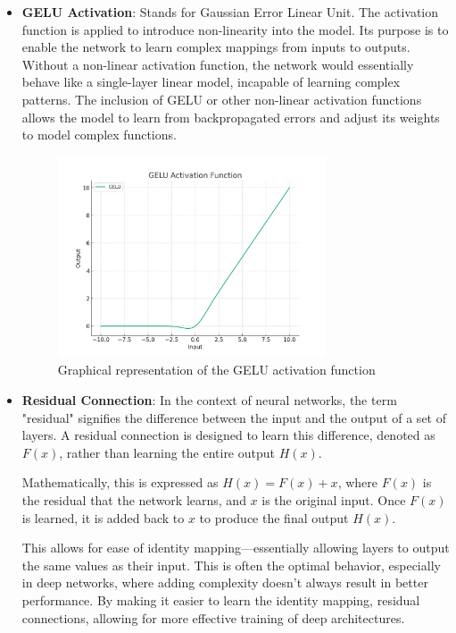 \documentclass[a4paper,12pt,openright]{book}
\begin{document}
\begin{itemize}
    
   \item \textbf{GELU Activation}: Stands for Gaussian Error Linear Unit. The activation function is applied to introduce non-linearity into the model. Its purpose is to enable the network to learn complex mappings from inputs to outputs. Without a non-linear activation function, the network would essentially behave like a single-layer linear model, incapable of learning complex patterns. The inclusion of GELU or other non-linear activation functions allows the model to learn from backpropagated errors and adjust its weights to model complex functions.
   
    \begin{figure}[ht]
        \centering
        \includegraphics[width=0.75\textwidth]{images/gelu.png}
        \caption{Graphical representation of the GELU activation function}
    \end{figure}

   \item \textbf{Residual Connection}:
In the context of neural networks, the term "residual" signifies the difference between the input and the output of a set of layers. A residual connection is designed to learn this difference, denoted as \( F(x) \), rather than learning the entire output \( H(x) \).

Mathematically, this is expressed as \( H(x) = F(x) + x \), where \( F(x) \) is the residual that the network learns, and \( x \) is the original input. Once \( F(x) \) is learned, it is added back to \( x \) to produce the final output \( H(x) \).

This allows for ease of identity mapping—essentially allowing layers to output the same values as their input. This is often the optimal behavior, especially in deep networks, where adding complexity doesn't always result in better performance. By making it easier to learn the identity mapping, residual connections, allowing for more effective training of deep architectures.
  
\end{itemize}
\end{document}
